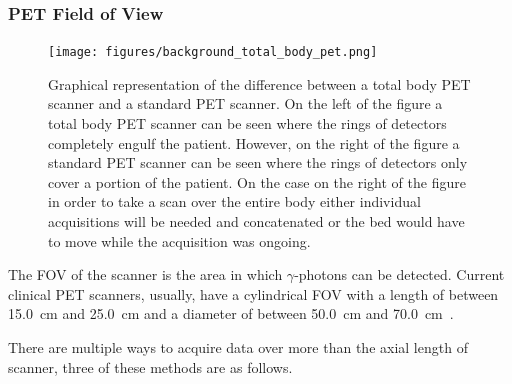             \subsubsection{PET Field of View} \label{sec:pet_field_of_view}
                \begin{figure}
                    \centering
                    
                    \texttt{[image: figures/background\_total\_body\_pet.png]}
                    
                    \captionsetup{singlelinecheck=false, justification=raggedright}
                    \caption{Graphical representation of the difference between a total body \gls{PET} scanner and a standard \gls{PET} scanner. On the left of the figure a total body \gls{PET} scanner can be seen where the rings of detectors completely engulf the patient. However, on the right of the figure a standard \gls{PET} scanner can be seen where the rings of detectors only cover a portion of the patient. On the case on the right of the figure in order to take a scan over the entire body either individual acquisitions will be needed and concatenated or the bed would have to move while the acquisition was ongoing.} \label{fig:pet_fov_total_body_pet}
                \end{figure}
                
                The \gls{FOV} of the scanner is the area in which $\gamma$-photons can be detected. Current clinical \gls{PET} scanners, usually, have a cylindrical \gls{FOV} with a length of between \SI{15.0}{\centi\metre} and \SI{25.0}{\centi\metre} and a diameter of between \SI{50.0}{\centi\metre} and \SI{70.0}{\centi\metre}~\parencite{Pan2019}.
                
                There are multiple ways to acquire data over more than the axial length of scanner, three of these methods are as follows.
                
